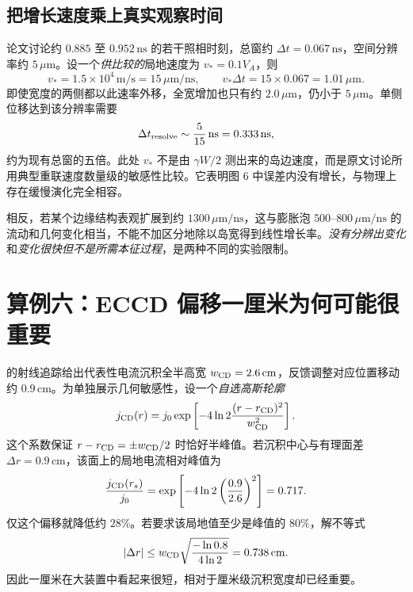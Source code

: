 \subsection{把增长速度乘上真实观察时间}

论文讨论约 $0.885$ 至 $0.952\,\mathrm{ns}$ 的若干照相时刻，总窗约 $\Delta t=0.067\,\mathrm{ns}$，空间分辨率约 $5\,\mu\mathrm m$。设一个\emph{供比较的}局地速度为 $v_*=0.1V_A$，则
\begin{equation}
 v_*=1.5\times10^4\,\mathrm{m/s}=15\,\mu\mathrm{m/ns},
 \qquad v_*\Delta t=15\times0.067=1.01\,\mu\mathrm m.
\end{equation}
即使宽度的两侧都以此速率外移，全宽增加也只有约 $2.0\,\mu\mathrm m$，仍小于 $5\,\mu\mathrm m$。单侧位移达到该分辨率需要
\begin{equation}
 \Delta t_{\rm resolve}\sim\frac{5}{15}\,\mathrm{ns}=0.333\,\mathrm{ns},
\end{equation}
约为现有总窗的五倍。此处 $v_*$ 不是由 $\gamma W/2$ 测出来的岛边速度，而是原文讨论所用典型重联速度数量级的敏感性比较。它表明图 6 中误差内没有增长，与物理上存在缓慢演化完全相容。

相反，若某个边缘结构表观扩展到约 $1300\,\mu\mathrm{m/ns}$，这与膨胀泡 $500$--$800\,\mu\mathrm{m/ns}$ 的流动和几何变化相当，不能不加区分地除以岛宽得到线性增长率。\emph{没有分辨出变化}和\emph{变化很快但不是所需本征过程}，是两种不同的实验限制。\citep{TMPearcy2024}

\section{算例六：ECCD 偏移一厘米为何可能很重要}

\citet{TMPetty2003} 的射线追踪给出代表性电流沉积全半高宽 $w_{\rm CD}=2.6\,\mathrm{cm}$，反馈调整对应位置移动约 $0.9\,\mathrm{cm}$。为单独展示几何敏感性，设一个\emph{自选高斯轮廓}
\begin{equation}
 j_{\rm CD}(r)=j_0\exp\left[-4\ln2\frac{(r-r_{\rm CD})^2}{w_{\rm CD}^2}\right].
\end{equation}
这个系数保证 $r-r_{\rm CD}=\pm w_{\rm CD}/2$ 时恰好半峰值。若沉积中心与有理面差 $\Delta r=0.9\,\mathrm{cm}$，该面上的局地电流相对峰值为
\begin{equation}
 \frac{j_{\rm CD}(r_s)}{j_0}
 =\exp\left[-4\ln2\left(\frac{0.9}{2.6}\right)^2\right]
 =0.717.
\end{equation}
仅这个偏移就降低约 $28\%$。若要求该局地值至少是峰值的 $80\%$，解不等式
\begin{equation}
 |\Delta r|\leq w_{\rm CD}\sqrt{\frac{-\ln0.8}{4\ln2}}
 =0.738\,\mathrm{cm}.
\end{equation}
因此一厘米在大装置中看起来很短，相对于厘米级沉积宽度却已经重要。

